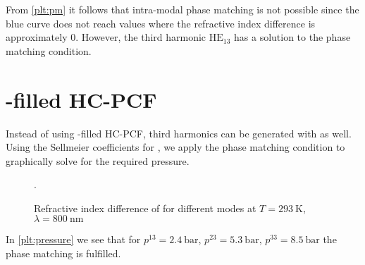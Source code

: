 \documentclass[fleqn, 10pt, twocolumn]{SelfArx}
\begin{document}
    From \autoref{plt:pm} it follows that intra-modal phase matching is not possible since the blue curve does not reach values where the refractive index difference is approximately 0.
    However, the third harmonic $\text{HE}_{13}$ has a solution to the phase matching condition.

\section{-filled HC-PCF}
    Instead of using -filled HC-PCF, third harmonics can be generated with  as well. 
    Using the Sellmeier coefficients for , we apply the phase matching condition to 
    graphically solve for the required pressure.
    \begin{figure}[H]
        \centering
        \caption{Refractive index difference of  for different  modes at $T=\SI{293}{\kelvin}$,  $\lambda=\SI{800}{\nano\meter}$}.
        \label{plt:pressure}
    \end{figure}
    In \autoref{plt:pressure} we see that for $p^{13}=\SI{2.4}{\bar}$, $p^{23}=\SI{5.3}{\bar}$, $p^{33}=\SI{8.5}{\bar}$ the phase matching is fulfilled. 
\end{document}
